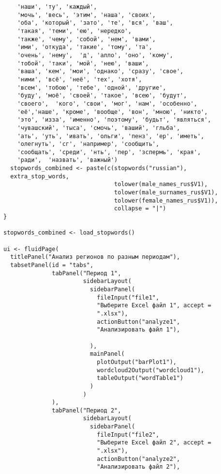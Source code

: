 \documentclass[bachelor, och, diploma ]{SCWorks}
\begin{document}
\begin{verbatim}
    'наши', 'ту', 'каждый',
    'мочь', 'весь', 'этим', 'наша', 'своих', 
    'оба', 'который', 'зато', 'те', 'вся', 'ваш', 
    'такая', 'теми', 'ею', 'нередко',
    'также', 'чему', 'собой', 'нем', 'вами', 
    'ими', 'откуда', 'такие', 'тому', 'та', 
    'очень', 'нему',  'д', 'алло', 'оно', 'кому', 
    'тобой', 'таки', 'мой', 'нею', 'ваши', 
    'ваша', 'кем', 'мои', 'однако', 'сразу', 'свое', 
    'ними', 'всё', 'неё', 'тех', 'хотя', 
    'всем', 'тобою', 'тебе', 'одной', 'другие',
    'буду', 'моё', 'своей', 'такое', 'всею', 'будут', 
    'своего',  'кого', 'свои', 'мог', 'нам', 'особенно', 
    'её','наше', 'кроме', 'вообще', 'вон', 'мною', 'никто', 
    'это', 'изза', 'именно', 'поэтому', 'будьт', 'являться', 
    'чувашский', 'тыса', 'смочь', 'ваший', 'гльба', 
    'ать', 'уть', 'ивать', 'ольги', 'пенз', 'ер', 'иметь', 
    'олегнуть', 'сг', 'например', 'сообщить', 
    'сообщать', 'среди', 'нть', 'пер', 'зспермь', 'края', 
    'ради',  'назвать', 'важный')
  stopwords_combined <- paste(c(stopwords("russian"), 
  extra_stop_words,
                                tolower(male_names_rus$V1),
                                tolower(male_surnames_rus$V1),
                                tolower(female_names_rus$V1)),
                                collapse = "|")
}

stopwords_combined <- load_stopwords()

ui <- fluidPage(
  titlePanel("Анализ регионов по разным периодам"),
  tabsetPanel(id = "tabs",
              tabPanel("Период 1",
                       sidebarLayout(
                         sidebarPanel(
                           fileInput("file1",
                           "Выберите Excel файл 1", accept = 
                           ".xlsx"),
                           actionButton("analyze1",
                           "Анализировать файл 1"),
                           
                         ),
                         mainPanel(
                           plotOutput("barPlot1"),
                           wordcloud2Output("wordcloud1"),
                           tableOutput("wordTable1")
                         )
                       )
              ),
              tabPanel("Период 2",
                       sidebarLayout(
                         sidebarPanel(
                           fileInput("file2",
                           "Выберите Excel файл 2", accept = 
                           ".xlsx"),
                           actionButton("analyze2", 
                           "Анализировать файл 2"),
                          

\end{verbatim}
\end{document}
